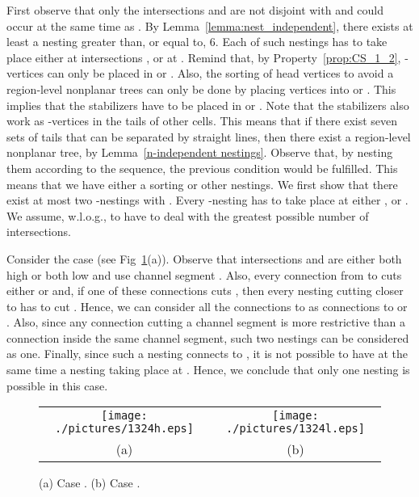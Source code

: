 \documentclass[a4paper,10pt]{llncs}
\newcounter{prop}
\renewenvironment{proof}
{{\bf Proof:}}{\hspace*{\fill}\par\vspace{2mm}}
\begin{document}
\begin{proof}
First observe that only the intersections  and  are not disjoint with  and could occur at the same time as . By Lemma~\ref{lemma:nest_independent}, there exists at least a nesting greater than, or equal to, 6. Each of such nestings has to take place either at intersections ,  or at . Remind that, by Property~\ref{prop:CS_1_2}, -vertices can only be placed in  or . Also, the sorting of head vertices to avoid a region-level nonplanar trees can only be done by placing vertices into  or . This implies that the stabilizers have to be placed in  or . Note that the stabilizers also work as -vertices in the tails of other cells. This means that if there exist seven sets of tails that can be separated by straight lines, then there exist a region-level nonplanar tree, by Lemma~\ref{n-independent nestings}.
Observe that, by nesting them according to the sequence, the previous condition would be fulfilled.
This means that we have either a sorting or other nestings. We first show that there exist at most two -nestings with . Every -nesting has to take place at either ,  or . We assume, w.l.o.g., to have to deal with the greatest possible number of intersections.

Consider the case  (see Fig~\ref{fig:1324}(a)). Observe that intersections  and  are either both high or both low and use channel segment . Also, every connection from  to  cuts either  or  and, if one of these connections cuts , then every nesting cutting  closer to  has to cut . Hence, we can consider all the connections to  as connections to  or . Also, since any connection cutting a channel segment is more restrictive than a connection inside the same channel segment, such two nestings can be considered as one. Finally, since such a nesting connects to , it is not possible to have at the same time a nesting taking place at . Hence, we conclude that only one nesting is possible in this case.

\begin{figure}[ht]
\begin{center}
\begin{tabular}{c c}
\mbox{\texttt{[image: ./pictures/1324h.eps]}} \hspace{0.1cm} &
\mbox{\texttt{[image: ./pictures/1324l.eps]}} \\
(a) & (b)\\
\end{tabular}
\caption{(a) Case  . (b) Case  .}
\label{fig:1324}
\end{center}
\end{figure}


\end{proof}
\end{document}

